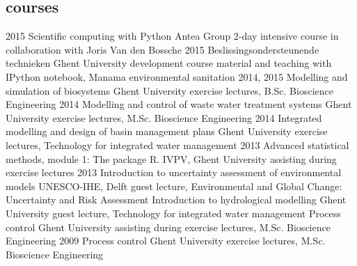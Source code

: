 \documentclass[]{stvhoey-cv}  %
\begin{document}
\subsection*{courses}
\begin{entrylist}
  \entry
    {2015}
    {Scientific computing with Python}
    {Antea Group}
    {2-day intensive course in collaboration with Joris Van den Bossche}
  \entry
    {2015}
    {Beslissingsondersteunende technieken}
    {Ghent University}
    {development course material and teaching with IPython notebook, Manama environmental sanitation}
  \entry
    {2014, 2015}
    {Modelling and simulation of biosystems}
    {Ghent University}
    {exercise lectures, B.Sc. Bioscience Engineering}
   \entry
    {2014} %
    {Modelling and control of waste water treatment systems}
    {Ghent University}
    {exercise lectures, M.Sc. Bioscience Engineering}
   \entry
    {2014}%
    {Integrated modelling and design of basin management plans}
    {Ghent University}
    {exercise lectures, Technology for integrated water management}
   \entry
    {2013}
    {Advanced statistical methods, module 1: The package R.}
    {IVPV, Ghent University}
    {assisting during exercise lectures}
   \entry
    {2013}
    {Introduction to uncertainty assessment of environmental models}
    {UNESCO-IHE, Delft}
    {guest lecture, Environmental and Global Change: Uncertainty and Risk Assessment}
   \entry
    {}
    {Introduction to hydrological modelling}
    {Ghent University}
    {guest lecture, Technology for integrated water management}
   \entry
	{} %
    {Process control}
    {Ghent University}
    {assisting during exercise lectures, M.Sc. Bioscience Engineering}
   \entry
    {2009}
    {Process control}
    {Ghent University}
    {exercise lectures, M.Sc. Bioscience Engineering}
\end{entrylist}
\end{document}
